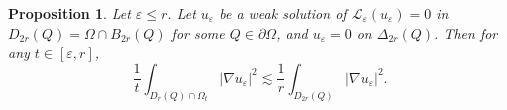 \documentclass[reqno,12pt]{amsart} %
\newtheorem{proposition}[theorem]{Proposition}
\theoremstyle{definition}
\theoremstyle{remark}
\numberwithin{equation}{section}
\newcommand{\cL}{\mathcal{L}}
\newcommand{\e}{\varepsilon}
\begin{document}
\begin{proposition}\label{prop.LSRellich}
    Let $\e \le r$. Let $u_\e$ be a weak solution of $\cL_\e(u_\e) = 0$ in $D_{2r}(Q) = \Omega \cap B_{2r}(Q)$ for some $Q \in \partial \Omega$, and $u_\e = 0$ on $\Delta_{2r}(Q)$. Then for any $t\in [\e,r]$, 
    \begin{equation}
        \frac{1}{t} \int_{D_r(Q) \cap \Omega_t} |\nabla u_\e|^2 \lesssim \frac{1}{r} \int_{D_{2r}(Q)} |\nabla u_\e|^2.
    \end{equation}
\end{proposition}

\end{document}
